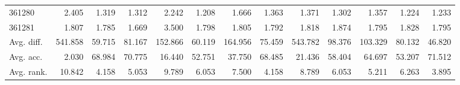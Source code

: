 \begin{tabular}{lrrrrrrrrrrrr}
361280 & 2.405 & 1.319 & 1.312 & 2.242 & 1.208 & 1.666 & 1.363 & 1.371 & 1.302 & 1.357 & 1.224 & 1.233 \\
361281 & 1.807 & 1.785 & 1.669 & 3.500 & 1.798 & 1.805 & 1.792 & 1.818 & 1.874 & 1.795 & 1.828 & 1.795 \\
Avg. diff. & 541.858 & 59.715 & 81.167 & 152.866 & 60.119 & 164.956 & 75.459 & 543.782 & 98.376 & 103.329 & 80.132 & 46.820 \\
Avg. acc. & 2.030 & 68.984 & 70.775 & 16.440 & 52.751 & 37.750 & 68.485 & 21.436 & 58.404 & 64.697 & 53.207 & 71.512 \\
Avg. rank. & 10.842 & 4.158 & 5.053 & 9.789 & 6.053 & 7.500 & 4.158 & 8.789 & 6.053 & 5.211 & 6.263 & 3.895 \\
\bottomrule
\end{tabular}
